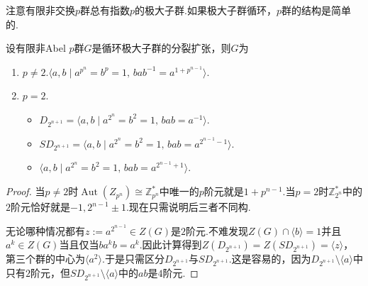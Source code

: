 注意有限非交换$p$群总有指数$p$的极大子群.如果极大子群循环，$p$群的结构是简单的.
\begin{prop}
	设有限非Abel $p$群$G$是循环极大子群的分裂扩张，则$G$为
	\begin{enumerate}
		\item $p\ne 2$.\quad$\langle a,b\mid a^{p^n}=b^p=1,\,bab^{-1}=a^{1+p^{n-1}}\rangle $.
		\item $p=2$.\begin{itemize}
			\item $D_{2^{n+1}}=\langle a,b\mid a^{2^n}=b^2=1,\,bab=a^{-1}\rangle $.
			\item $SD_{2^{n+1}}=\langle a,b\mid a^{2^n}=b^2=1,\,bab=a^{2^{n-1}-1}\rangle $.
			\item $\langle a,b\mid a^{2^n}=b^2=1,\,bab=a^{2^{n-1}+1}\rangle$.
		\end{itemize}
	\end{enumerate}\hypertarget{prop:pGroupCyclicMax1}{}
\end{prop}
\begin{proof}
	当$p\ne 2$时$\operatorname*{Aut}(Z_{p^{n}})\cong\mathbb{Z}_{p^n}^*$中唯一的$p$阶元就是$1+p^{n-1}$.当$p=2$时$\mathbb{Z}_{2^n}^*$中的$2$阶元恰好就是$-1,2^{n-1}\pm 1$.现在只需说明后三者不同构.

	无论哪种情况都有$z:=a^{2^{n-1}}\in Z(G)$是$2$阶元.不难发现$Z(G)\cap\langle b\rangle =1$并且$a^k\in Z(G)$当且仅当$ba^kb=a^k$.因此计算得到$Z(D_{2^{n+1}})=Z(SD_{2^{n+1}})=\langle z\rangle $，第三个群的中心为$\langle a^2\rangle $.于是只需区分$D_{2^{n+1}}$与$SD_{2^{n+1}}$.这是容易的，因为$D_{2^{n+1}}\setminus\langle a\rangle $中只有$2$阶元，但$SD_{2^{n+1}}\setminus\langle a\rangle $中的$ab$是$4$阶元.
\end{proof}

